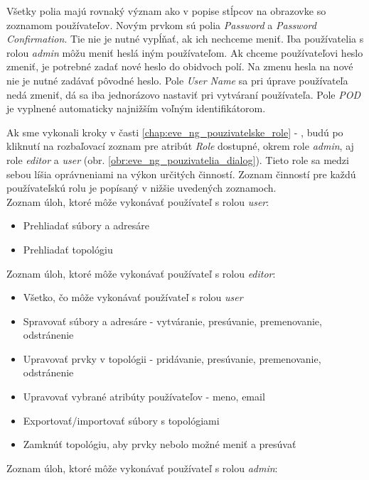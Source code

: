 Všetky polia majú rovnaký význam ako v popise stĺpcov na obrazovke so zoznamom používateľov. Novým prvkom sú polia \emph{Password} a \emph{Password Confirmation}. Tie nie je nutné vypĺňať, ak ich nechceme meniť. Iba používatelia s rolou \emph{admin} môžu meniť heslá iným používateľom. Ak chceme používateľovi heslo zmeniť, je potrebné zadať nové heslo do obidvoch polí. Na zmenu hesla na nové nie je nutné zadávať pôvodné heslo. Pole \emph{User Name} sa pri úprave používateľa nedá zmeniť, dá sa iba jednorázovo nastaviť pri vytváraní používateľa. Pole \emph{POD} je vyplnené automaticky najnižším voľným identifikátorom.

Ak sme vykonali kroky v časti \ref{chap:eve_ng_pouzivatelske_role} - , budú po kliknutí na rozbaľovací zoznam pre atribút \emph{Role} dostupné, okrem role \emph{admin}, aj role \emph{editor} a \emph{user} (obr. \ref{obr:eve_ng_pouzivatelia_dialog}). Tieto role sa medzi sebou líšia oprávneniami na výkon určitých činností. Zoznam činností pre každú používateľskú rolu je popísaný v nižšie uvedených zoznamoch. \\

\noindent
Zoznam úloh, ktoré môže vykonávať používateľ s rolou \emph{user}:

\begin{itemize}[noitemsep]
    \item Prehliadať súbory a adresáre
    \item Prehliadať topológiu
\end{itemize}

\noindent
Zoznam úloh, ktoré môže vykonávať používateľ s rolou \emph{editor}:

\begin{itemize}[noitemsep]
    \item Všetko, čo môže vykonávať používateľ s rolou \emph{user}
    \item Spravovať súbory a adresáre - vytváranie, presúvanie, premenovanie, odstránenie
    \item Upravovať prvky v topológii - pridávanie, presúvanie, premenovanie, odstránenie
    \item Upravovať vybrané atribúty používateľov - meno, email
    \item Exportovať/importovať súbory s topológiami
    \item Zamknúť topológiu, aby prvky nebolo možné meniť a presúvať
\end{itemize}

\noindent
Zoznam úloh, ktoré môže vykonávať používateľ s rolou \emph{admin}:

